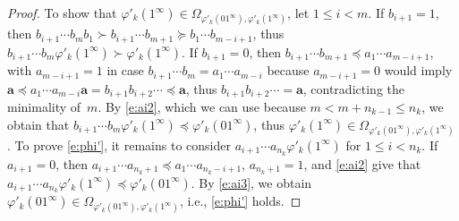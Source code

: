 \documentclass[10pt,a4paper]{amsart}
\newcommand{\ba}{\mathbf{a}}
\begin{document}
\begin{proof}
To show that $\varphi'_k(1^\infty) \in \Omega_{\varphi'_k(01^\infty),\varphi'_k(1^\infty)}$, let $1 \le i < m$.
If $b_{i+1} = 1$, then $b_{i+1} \cdots b_m b_1 \succ b_{i+1} \cdots b_{m+1} \succeq b_1 \cdots b_{m-i+1}$, thus $b_{i+1} \cdots b_m \varphi'_k(1^\infty) \succ \varphi'_k(1^\infty)$.
If $b_{i+1} = 0$, then $b_{i+1} \cdots b_{m+1} \preceq a_1 \cdots a_{m-i+1}$, with $a_{m-i+1} = 1$ in case $b_{i+1} \cdots b_m = a_1 \cdots a_{m-i}$ because $a_{m-i+1} = 0$ would imply $\ba \preceq a_1 \cdots a_{m-i} \ba = b_{i+1} b_{i+2} \cdots \preceq \ba$, thus $b_{i+1} b_{i+2} \cdots = \ba$, contradicting the minimality of~$m$.
By \eqref{e:ai2}, which we can use because $m < m{+}n_{k-1} \le n_k$, we obtain that $b_{i+1} \cdots b_m \varphi'_k(1^\infty) \preceq \varphi'_k(01^\infty)$, thus $\varphi'_k(1^\infty) \in \Omega_{\varphi'_k(01^\infty),\varphi'_k(1^\infty)}$.
To prove \eqref{e:phi'}, it remains to consider $a_{i+1} \cdots a_{n_k} \varphi'_k(1^\infty)$ for $1 \le i < n_k$.
If $a_{i+1} = 0$, then $a_{i+1} \cdots a_{n_k+1} \preceq a_1 \cdots a_{n_k-i+1}$,  
$a_{n_k+1} = 1$, and \eqref{e:ai2} give that $a_{i+1} \cdots a_{n_k} \varphi'_k(1^\infty) \preceq \varphi'_k(01^\infty)$.
By \eqref{e:ai3}, we obtain $\varphi'_k(01^\infty) \in \Omega_{\varphi'_k(01^\infty),\varphi'_k(1^\infty)}$, i.e., \eqref{e:phi'} holds.


\end{proof}
\end{document}
